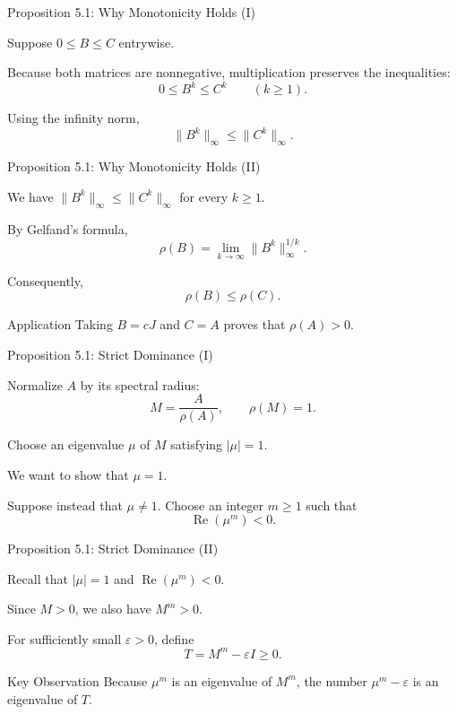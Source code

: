\documentclass{beamer}
\begin{document}

\begin{frame}{Proposition 5.1: Why Monotonicity Holds (I)}
\small

Suppose $0\leq B\leq C$ entrywise.

Because both matrices are nonnegative,
multiplication preserves the inequalities:
\[
0\leq B^k\leq C^k
\qquad(k\geq1).
\]

Using the infinity norm,
\[
\|B^k\|_\infty\leq\|C^k\|_\infty.
\]
\end{frame}

\begin{frame}{Proposition 5.1: Why Monotonicity Holds (II)}
\small

We have $\|B^k\|_\infty\leq\|C^k\|_\infty$ for every $k\geq1$.

By Gelfand's formula,
\[
\rho(B)=\lim_{k\to\infty}
\|B^k\|_\infty^{1/k}.
\]

Consequently,
\[
\boxed{\rho(B)\leq\rho(C).}
\]

\begin{block}{Application}
Taking $B=cJ$ and $C=A$ proves
that $\rho(A)>0$.
\end{block}
\end{frame}

\begin{frame}{Proposition 5.1: Strict Dominance (I)}
\small

Normalize $A$ by its spectral radius:
\[
M=\frac{A}{\rho(A)},\qquad \rho(M)=1.
\]

Choose an eigenvalue $\mu$ of $M$ satisfying
$|\mu|=1$.

We want to show that $\mu=1$.

Suppose instead that $\mu\neq1$.
Choose an integer $m\geq1$ such that
\[
\operatorname{Re}(\mu^m)<0.
\]
\end{frame}

\begin{frame}{Proposition 5.1: Strict Dominance (II)}
\small

Recall that $|\mu|=1$ and $\operatorname{Re}(\mu^m)<0$.

Since $M>0$, we also have $M^m>0$.

For sufficiently small $\varepsilon>0$,
define
\[
T=M^m-\varepsilon I\geq0.
\]

\begin{block}{Key Observation}
Because $\mu^m$ is an eigenvalue of $M^m$,
the number $\mu^m-\varepsilon$ is an
eigenvalue of $T$.
\end{block}
\end{frame}
\end{document}
